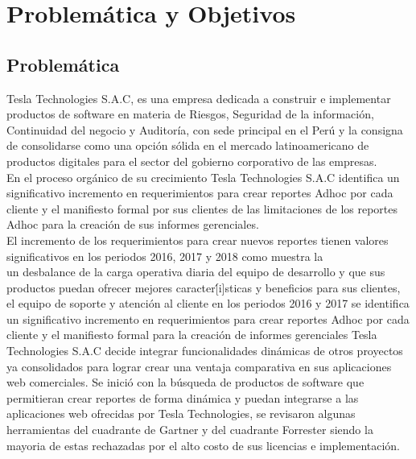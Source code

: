 
\chapter{Problemática y Objetivos} \label{chapter:I}
\section{Problem\'{a}tica}
\begin{spacing}{1.5}
	Tesla Technologies S.A.C, es una empresa dedicada a construir e implementar productos de software en materia de Riesgos, Seguridad de la información, Continuidad del negocio y Auditoría, con sede principal en el Perú y la consigna de consolidarse como una opci\'{o}n s\'{o}lida en el mercado latinoamericano de productos digitales para el sector del gobierno corporativo de las empresas.\\
	En el proceso org\'{a}nico de su crecimiento Tesla Technologies S.A.C  identifica un significativo incremento en requerimientos para crear reportes Adhoc por cada cliente y el manifiesto formal por sus clientes de las limitaciones de los reportes Adhoc para la creación de sus informes gerenciales.\\
	El incremento de los requerimientos para crear nuevos reportes tienen valores significativos en los periodos 2016, 2017 y 2018 como muestra la \\
	un desbalance de la carga operativa diaria del equipo de desarrollo y que sus productos puedan ofrecer mejores caracter\'[i]sticas y beneficios para sus clientes, el equipo de soporte y atenci\'{o}n al cliente  en los periodos 2016 y 2017 se identifica un significativo incremento en requerimientos para crear reportes Adhoc por cada cliente y el manifiesto formal   para la creación de informes gerenciales Tesla Technologies S.A.C decide integrar funcionalidades dinámicas de otros proyectos ya consolidados para lograr crear una ventaja comparativa en sus aplicaciones web comerciales.
	Se inició con la búsqueda de productos de software que permitieran crear reportes de forma dinámica y puedan integrarse a las aplicaciones web ofrecidas por Tesla Technologies, se revisaron algunas herramientas del cuadrante de Gartner y del cuadrante Forrester siendo la mayoria de estas rechazadas por el alto costo de sus licencias e implementación.\\

\end{spacing}
